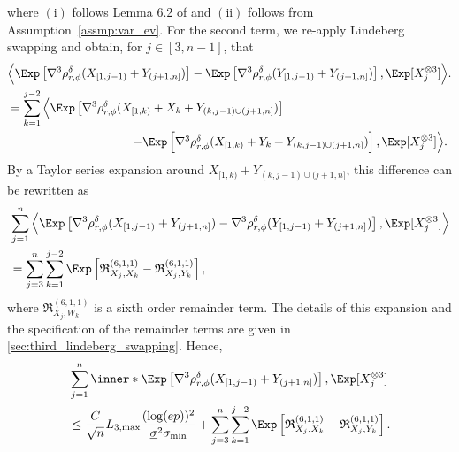 \documentclass[aos]{imsart}
\begin{document}
where $\mathrm{(i)}$ follows Lemma 6.2 of  and $\mathrm{(ii)}$ follows from Assumption~\eqref{assmp:var_ev}.
For the second term, we re-apply Lindeberg swapping and obtain, for $j \in [3, n-1]$, that
\begin{equation} \label{eq:third_lindeberg_swapping_N}
\begin{aligned}
    & \Big\langle 
        \Exp\left[ \nabla^3 \rho_{r,\phi}^\delta(X_{[1,j-1)} + Y_{(j+1,n]}) \right] 
    - \Exp\left[ \nabla^3  \rho_{r,\phi}^\delta(Y_{[1,j-1)} + Y_{(j+1,n]}) \right], \Exp[ X_j^{\otimes 3} ]\Big\rangle. \\
    & = \sum_{k=1}^{j-2} \Big\langle
        \Exp\left[ \nabla^3 \rho_{r,\phi}^\delta(X_{[1,k)} + X_k + Y_{(k,j-1) \cup (j+1,n]}) \right] \\ 
    & \omit{\hfill $- \Exp\left[ \nabla^3   \rho_{r,\phi}^\delta(X_{[1,k)} + Y_k + Y_{(k,j-1) \cup (j+1,n]}) \right], 
        \Exp[ X_j^{\otimes 3} ]
    \Big\rangle.$} \\
\end{aligned}
\end{equation}
By a Taylor series expansion around $X_{[1,k)} + Y_{(k,j-1) \cup (j+1,n]}$, this difference can be rewritten as 
\begin{equation} \label{eq:third_lindeberg_result_N}
\begin{aligned}
    & \sum_{j=1}^{n} \Big\langle 
        \Exp\left[ \nabla^3 \rho_{r,\phi}^\delta(X_{[1,j-1)} + Y_{(j+1,n]}) 
        - \nabla^3 \rho_{r,\phi}^\delta(Y_{[1,j-1)} + Y_{(j+1,n]}) \right], 
        \Exp[ X_j^{\otimes 3} ]
    \Big\rangle \\
    & = \sum_{j=3}^{n} \sum_{k=1}^{j-2} \Exp \left[ 
        \mathfrak{R}_{X_j,X_k}^{(6,1,1)}
        - \mathfrak{R}_{X_j,Y_k}^{(6,1,1)}
    \right], \\
\end{aligned}
\end{equation}
where $\mathfrak{R}_{X_j,W_k}^{(6,1,1)}$ is a sixth order remainder term. The details of this expansion and the specification of the remainder terms %
are given in \cref{sec:third_lindeberg_swapping}. 
Hence, 
\begin{equation*}
\begin{aligned}
    & \sum_{j=1}^{n}  
    \inner*{ \Exp\left[ \nabla^3 \rho_{r,\phi}^\delta(X_{[1,j-1)} + Y_{(j+1,n]}) \right], \Exp[ X_j^{\otimes 3} ]} \\
    & \leq \frac{C}{\sqrt{n}} L_{3,\max} \frac{(\log(ep))^2}{\underline\sigma^2 \sigma_{\min}}
    + \sum_{j=3}^{n} \sum_{k=1}^{j-2} \Exp \left[ 
        \mathfrak{R}_{X_j,X_k}^{(6,1,1)}
        - \mathfrak{R}_{X_j,Y_k}^{(6,1,1)}
    \right].
\end{aligned}
\end{equation*}
\end{document}
